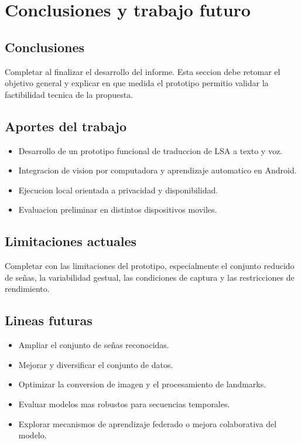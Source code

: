 \chapter{Conclusiones y trabajo futuro}

\section{Conclusiones}

Completar al finalizar el desarrollo del informe. Esta seccion debe retomar el objetivo general y explicar en que medida el prototipo permitio validar la factibilidad tecnica de la propuesta.

\section{Aportes del trabajo}

\begin{itemize}
    \item Desarrollo de un prototipo funcional de traduccion de LSA a texto y voz.
    \item Integracion de vision por computadora y aprendizaje automatico en Android.
    \item Ejecucion local orientada a privacidad y disponibilidad.
    \item Evaluacion preliminar en distintos dispositivos moviles.
\end{itemize}

\section{Limitaciones actuales}

Completar con las limitaciones del prototipo, especialmente el conjunto reducido de señas, la variabilidad gestual, las condiciones de captura y las restricciones de rendimiento.

\section{Lineas futuras}

\begin{itemize}
    \item Ampliar el conjunto de señas reconocidas.
    \item Mejorar y diversificar el conjunto de datos.
    \item Optimizar la conversion de imagen y el procesamiento de landmarks.
    \item Evaluar modelos mas robustos para secuencias temporales.
    \item Explorar mecanismos de aprendizaje federado o mejora colaborativa del modelo.
\end{itemize}
